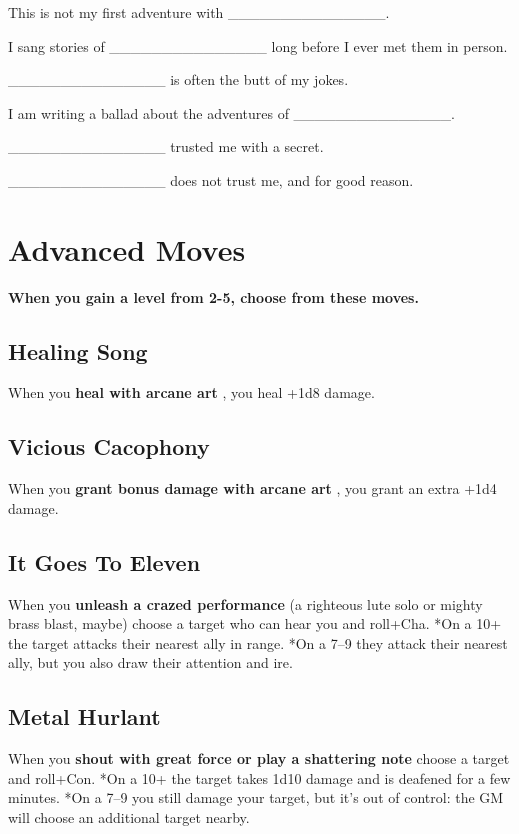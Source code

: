 \noindent This is not my first adventure with \_\_\_\_\_\_\_\_\_\_\_\_\_\_\_.


\noindent I sang stories of \_\_\_\_\_\_\_\_\_\_\_\_\_\_\_ long before I ever met them in person.


\noindent \_\_\_\_\_\_\_\_\_\_\_\_\_\_\_ is often the butt of my jokes.


\noindent I am writing a ballad about the adventures of \_\_\_\_\_\_\_\_\_\_\_\_\_\_\_.


\noindent \_\_\_\_\_\_\_\_\_\_\_\_\_\_\_ trusted me with a secret.


\noindent \_\_\_\_\_\_\_\_\_\_\_\_\_\_\_ does not trust me, and for good reason.
\section*{Advanced Moves}


 {\bfseries When you gain a level from 2-5, choose from these moves.}
\subsection{Healing Song}


 When you \textbf{heal with arcane art}
, you heal +1d8 damage.
\subsection{Vicious Cacophony}


 When you \textbf{grant bonus damage with arcane art}
, you grant an extra +1d4 damage.
\subsection{It Goes To Eleven}


 When you \textbf{unleash a crazed performance}
 (a righteous lute solo or mighty brass blast, maybe) choose a target who can hear you and roll+Cha. *On a 10+ the target attacks their nearest ally in range. *On a 7--9 they attack their nearest ally, but you also draw their attention and ire.
\subsection{Metal Hurlant}


 When you \textbf{shout with great force or play a shattering note}
 choose a target and roll+Con. *On a 10+ the target takes 1d10 damage and is deafened for a few minutes. *On a 7--9 you still damage your target, but it's out of control: the GM will choose an additional target nearby.
